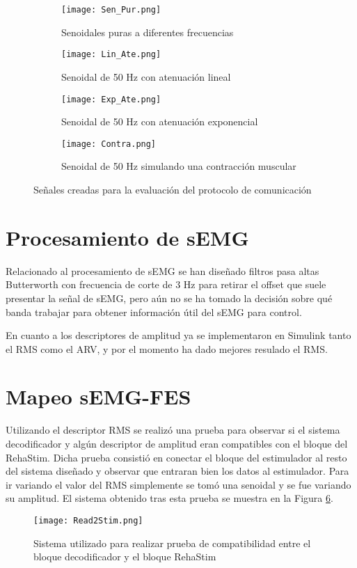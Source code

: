 \begin{figure}[htbp]
	\centering
	\begin{subfigure}[htbp]{0.4\textwidth}
		\texttt{[image: Sen\_Pur.png]}
		\caption{Senoidales puras a diferentes frecuencias}
		\label{Figura: SenPur}
	\end{subfigure}
	\hfill
	\begin{subfigure}[htbp]{0.4\textwidth}
		\texttt{[image: Lin\_Ate.png]}
		\caption{Senoidal de 50 Hz con atenuación lineal}
		\label{Figura: LinAte}
	\end{subfigure}
	\hfill
	\begin{subfigure}[htbp]{0.4\textwidth}
		\texttt{[image: Exp\_Ate.png]}
		\caption{Senoidal de 50 Hz con atenuación exponencial}
		\label{Figura: ExpAte}
	\end{subfigure}
	\hfill
	\begin{subfigure}[htbp]{0.4\textwidth}
		\texttt{[image: Contra.png]}
		\caption{Senoidal de 50 Hz simulando una contracción muscular}
		\label{Figura: Contra}
	\end{subfigure}	
	\caption{Señales creadas para la evaluación del protocolo de comunicación}
	\label{Figura: SenalesEva}
\end{figure}

\section{Procesamiento de sEMG}
Relacionado al procesamiento de sEMG se han diseñado filtros pasa altas Butterworth con frecuencia de corte de 3 Hz para retirar el offset que suele presentar la señal de sEMG, pero aún no se ha tomado la decisión sobre qué banda trabajar para obtener información útil del sEMG para control.

En cuanto a los descriptores de amplitud ya se implementaron en Simulink tanto el RMS como el ARV, y por el momento ha dado mejores resulado el RMS.

\section{Mapeo sEMG-FES}
Utilizando el descriptor RMS se realizó una prueba para observar si el sistema decodificador y algún descriptor de amplitud eran compatibles con el bloque del RehaStim. Dicha prueba consistió en conectar el bloque del estimulador al resto del sistema diseñado y observar que entraran bien los datos al estimulador. Para ir variando el valor del RMS simplemente se tomó una senoidal y se fue variando su amplitud. El sistema obtenido tras esta prueba se muestra en la Figura \ref{Figura: Read2Stim}.

\begin{figure}[htbp]
	\centering
	\texttt{[image: Read2Stim.png]}
	\caption{Sistema utilizado para realizar prueba de compatibilidad entre el bloque decodificador y el bloque RehaStim}
	\label{Figura: Read2Stim}
\end{figure}